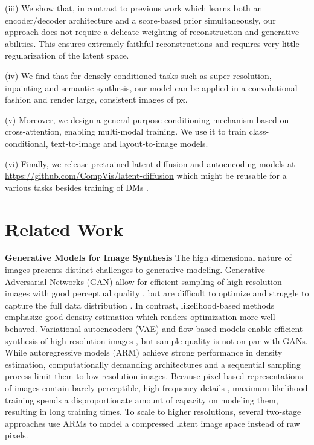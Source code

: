 \documentclass[10pt,twocolumn,letterpaper]{article}
\newcommand{\projectpath}{https://github.com/CompVis/latent-diffusion}
\begin{document}
(iii) We show that, in contrast to previous work \cite{DBLP:journals/corr/abs-2106-05931} which learns both an encoder/decoder architecture and a score-based prior simultaneously, our
approach does not require a delicate weighting of reconstruction and generative abilities. 
This ensures extremely faithful reconstructions and requires very little regularization of the latent space.

(iv) We find that for densely conditioned tasks such as super-resolution, inpainting and semantic synthesis, our model can be applied in a 
convolutional fashion and render large, consistent images of  px.

(v) Moreover, we design a general-purpose conditioning mechanism based on cross-attention, enabling multi-modal training. 
We use it to train class-conditional, text-to-image and layout-to-image models.

(vi) Finally, we release pretrained latent diffusion and autoencoding models at \url{\projectpath} 
which might be reusable for a various tasks besides 
training of DMs \cite{clipguiding}. 






\section{Related Work}
\enlargethispage{\baselineskip}
\vspace{-0.75em}
\textbf{Generative Models for Image Synthesis}
The high dimensional nature of images presents distinct challenges to generative modeling.
Generative Adversarial Networks (GAN) \cite{goodfellow2014GAN}
allow for efficient sampling of high resolution images with good perceptual quality \cite{bigganbrock, DBLP:journals/corr/abs-1912-04958}, but are difficult to optimize \cite{DBLP:journals/corr/abs-1801-04406,arjovsky2017wasserstein, gulrajani2017improved} and struggle to capture the full data distribution 
\cite{DBLP:conf/iclr/MetzPPS17}. 
In contrast, likelihood-based methods emphasize good density estimation which renders optimization more well-behaved.
Variational autoencoders (VAE) \cite{VAE}
and flow-based models \cite{dinh2015nice, DBLP:conf/iclr/DinhSB17} enable efficient synthesis of high resolution images \cite{DBLP:journals/corr/abs-2011-10650, DBLP:conf/nips/VahdatK20, glow}, but sample quality is not on par with GANs.
While autoregressive models (ARM) \cite{DBLP:journals/corr/OordKK16,
NIPS2016_b1301141, DBLP:conf/icml/ChenRC0JLS20,
DBLP:journals/corr/abs-1904-10509} achieve strong performance in density
estimation, computationally demanding architectures
\cite{DBLP:conf/nips/VaswaniSPUJGKP17} and a sequential sampling process limit them to low resolution images.
Because pixel based representations of images contain barely
perceptible, high-frequency details \cite{dieleman2020typicality,
DBLP:journals/corr/SalimansKCK17}, maximum-likelihood training spends a
disproportionate amount of capacity on modeling them, resulting in
long training times.
To scale to higher resolutions,
several two-stage approaches \cite{DBLP:journals/corr/abs-2104-10157, DBLP:conf/nips/RazaviOV19, DBLP:journals/corr/abs-2012-09841, yu2021vectorquantized}
use ARMs to model a compressed latent image space instead of raw pixels.
\end{document}
